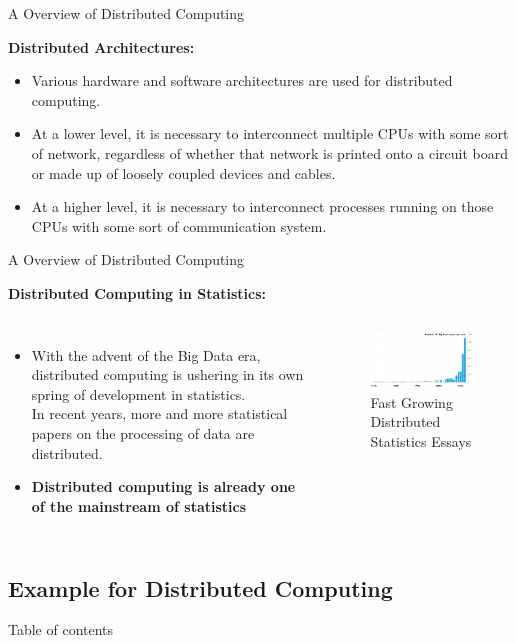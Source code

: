 \documentclass[10pt,aspectratio=169]{beamer}
\begin{document}
\begin{sloppypar}
\begin{frame}{A Overview of Distributed Computing} \par
{\bf{Distributed Architectures:}}
	\begin{itemize}
		\item Various hardware and software architectures are used for distributed computing.  
		\item At a lower level, it is
		necessary to interconnect multiple CPUs with some sort of network, regardless of whether that network is
		printed onto a circuit board or made up of loosely coupled devices and cables.
		\item At a higher level, it is necessary
		to interconnect processes running on those CPUs with some sort of communication system.
	\end{itemize}
\end{frame}

\begin{frame}{A Overview of Distributed Computing} \par
	{\bf{Distributed Computing in Statistics:}}
\begin{columns}      %
		\begin{itemize}
			\item With the advent of the Big Data era, distributed computing is ushering in its own spring of development in statistics. \\
			In recent years, more and more statistical papers on the processing of data are distributed. 
			\item {\bf{Distributed computing is already one of the mainstream of statistics}} 
				\end{itemize}
		\begin{figure}
			\centering
			\includegraphics[width=7cm]{picture//6} 
			\caption{Fast Growing Distributed Statistics Essays}
		\end{figure}
	\end{columns} 
\end{frame}
	
\subsection{Example for Distributed Computing}  
\begin{frame}[shrink]{Table of contents}
        \tableofcontents[sectionstyle=show/shaded,subsectionstyle=show/shaded/hide]
 \end{frame}






\end{sloppypar}
\end{document}

